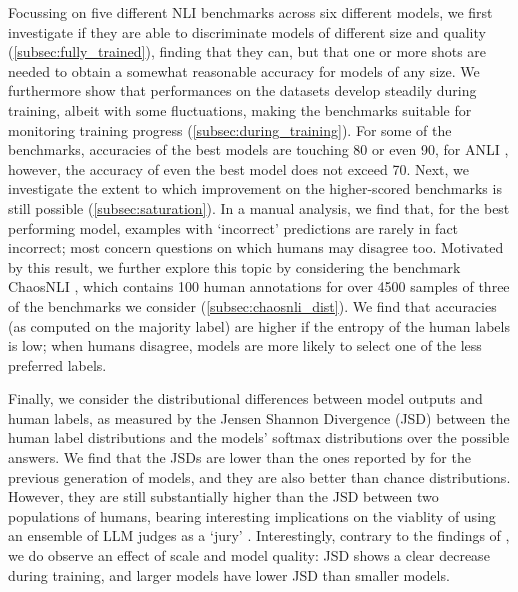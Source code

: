 Focussing on five different NLI benchmarks across six different models, we first investigate if they are able to discriminate models of different size and quality (\cref{subsec:fully_trained}), finding that they can, but that one or more shots are needed to obtain a somewhat reasonable accuracy for models of any size.
We furthermore show that performances on the datasets develop steadily during training, albeit with some fluctuations, making the benchmarks suitable for monitoring training progress (\cref{subsec:during_training}).
For some of the benchmarks, accuracies of the best models are touching 80 or even 90, for ANLI \citep{nie-etal-2020-adversarial}, however, the accuracy of even the best model does not exceed 70.
Next, we investigate the extent to which improvement on the higher-scored benchmarks is still possible (\cref{subsec:saturation}).
In a manual analysis, we find that, for the best performing model, examples with `incorrect' predictions are rarely in fact incorrect; most concern questions on which humans may disagree too.
Motivated by this result, we further explore this topic by considering the benchmark ChaosNLI \citep{nie-etal-2020-learn}, which contains 100 human annotations for over 4500 samples of three of the benchmarks we consider (\cref{subsec:chaosnli_dist}).
We find that accuracies (as computed on the majority label) are higher if the entropy of the human labels is low; when humans disagree, models are more likely to select one of the less preferred labels.

Finally, we consider the distributional differences between model outputs and human labels, as measured by the Jensen Shannon Divergence (JSD) between the human label distributions and the models' softmax distributions over the possible answers.
We find that the JSDs are lower than the ones reported by \citet{nie-etal-2020-learn} for the previous generation of models, and they are also better than chance distributions. 
However, they are still substantially higher than the JSD between two populations of humans, bearing interesting implications on the viablity of using an ensemble of LLM judges as a `jury' \citep[e.g.][]{verga2024replacing}.
Interestingly, contrary to the findings of \citet{nie-etal-2020-learn}, we do observe an effect of scale and model quality: JSD shows a clear decrease during training, and larger models have lower JSD than smaller models.


